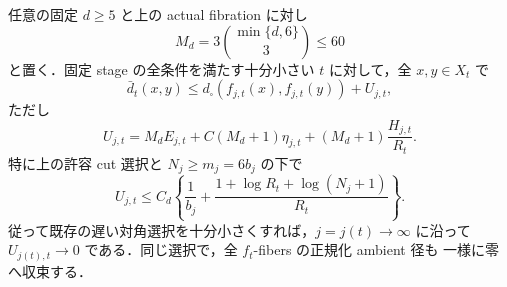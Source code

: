\begin{theorem}
\label{ke:global-ambient-upper}
任意の固定 $d\ge5$ と上の actual fibration に対し
\[
 M_d=3\binom{\min\{d,6\}}3\le60
\]
と置く．固定 stage の全条件を満たす十分小さい $t$ に対して，全 $x,y\in X_t$ で
\begin{equation}\label{ke:eq:global-ambient-upper}
 \bar d_t(x,y)
 \le d_\square(f_{j,t}(x),f_{j,t}(y))+U_{j,t},
\end{equation}
ただし
\begin{equation}\label{ke:eq:global-ambient-upper-error}
 U_{j,t}=M_dE_{j,t}
       +C(M_d+1)\eta_{j,t}
       +(M_d+1)\frac{H_{j,t}}{R_t}.
\end{equation}
特に上の許容 cut 選択と $N_j\ge m_j=6b_j$ の下で
\begin{equation}\label{ke:eq:global-upper-explicit-depth-error}
 U_{j,t}\le C_d\left\{\frac1{b_j}
       +\frac{1+\log R_t+\log(N_j+1)}{R_t}\right\}.
\end{equation}
従って既存の遅い対角選択を十分小さくすれば，$j=j(t)\to\infty$ に沿って
$U_{j(t),t}\to0$ である．同じ選択で，全 $f_t$-fibers の正規化 ambient 径も
一様に零へ収束する．
\end{theorem}

